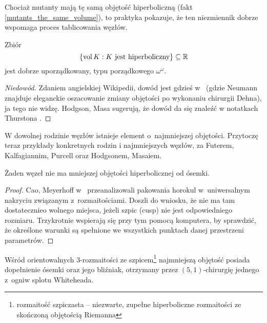 Chociaż mutanty mają tę samą objętość hiperboliczną (fakt \ref{mutants_the_same_volume}), to praktyka pokazuje, że ten niezmiennik dobrze wspomaga proces tablicowania węzłów.

\begin{proposition}
    Zbiór
    \[
        \{\operatorname{vol} K: K \textrm{ jest hiperboliczny}\} \subseteq \mathbb R
    \]
    jest dobrze uporządkowany, typu porządkowego $\omega^\omega$.
\end{proposition}

\begin{proof}[Niedowód]
    Zdaniem angielskiej Wikipedii, dowód jest gdzieś w~\cite{neumann85} (gdzie Neumann znajduje eleganckie oszacowanie zmiany objętości po wykonaniu chirurgii Dehna), ja tego nie widzę.
    Hodgson, Masa \cite{hodgson13} sugerują, że dowód da się znaleźć w notatkach Thurstona \cite{thurston02}.
\end{proof}

W dowolnej rodzinie węzłów istnieje element o~najmniejszej objętości.
Przytoczę teraz przykłady konkretnych rodzin i najmniejszych węzłów, za Futerem, Kalfagiannim, Purcell \cite[s. 16-17]{purcell19} oraz Hodgsonem, Masaiem\cite[s. 1-99]{hodgson13}.
%
%
%
%
%

\begin{proposition}
    Żaden węzeł nie ma mniejszej objętości hiperbolicznej od ósemki.
\end{proposition}

\begin{proof}
    Cao, Meyerhoff w~\cite{cao01} przeanalizowali pakowania horokul w~uniwersalnym nakryciu związanym z~rozmaitościami.
    Doszli do wniosku, że nie ma tam dostatecznieo wolnego miejsca, jeżeli szpic (cusp) nie jest odpowiedniego rozmiaru.
    Trzykrotnie wspierają się przy tym pomocą komputera, by sprawdzić, że określone warunki są spełnione we wszystkich punktach danej przestrzeni parametrów.
\end{proof}

\begin{proposition}
%
%
    Wśród orientowalnych 3-rozmaitości ze szpicem\footnote{rozmaitość szpiczasta -- niezwarte, zupełne hiperboliczne rozmaitości ze skończoną objętością Riemanna} najmniejszą objętość posiada dopełnienie ósemki oraz jego bliźniak, otrzymany przez $(5, 1)$-chirurgię jednego z~ogniw splotu Whiteheada.
\end{proposition}

